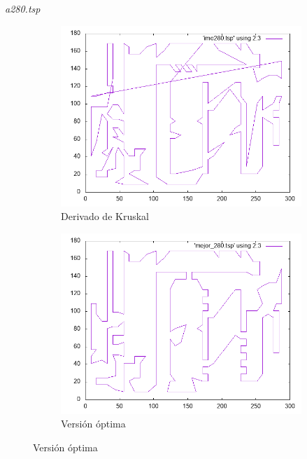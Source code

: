 \documentclass{beamer}
\begin{document}
\begin{frame}[fragile]{\textit{a280.tsp}}
\begin{figure}[H]
\begin{subfigure}[b]{0.36\textwidth}
\includegraphics[width=\textwidth]{a280_ime.png}
\caption*{\small{Derivado de Kruskal}}
\end{subfigure}
\quad
\begin{subfigure}[b]{0.36\textwidth}
\includegraphics[width=\textwidth]{a280_mejor.png}
\caption*{\small{Versión óptima}}
\end{subfigure}
\end{figure}

\end{frame}
\end{document}

